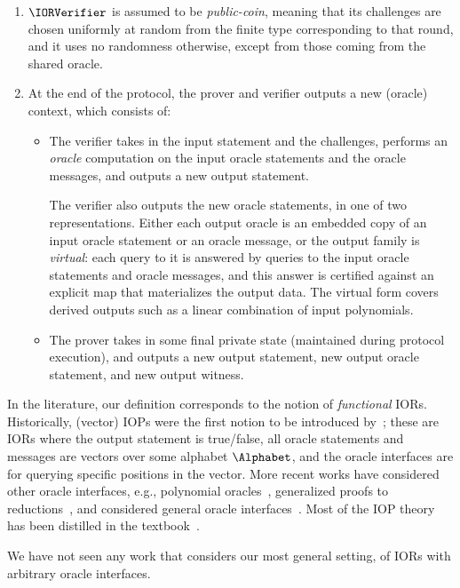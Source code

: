 \begin{enumerate}
    \item \(\IORVerifier\) is assumed to be \emph{public-coin}, meaning that its challenges are chosen
    uniformly at random from the finite type corresponding to that round, and it uses no randomness
    otherwise, except from those coming from the shared oracle.

    \item At the end of the protocol, the prover and verifier outputs a new (oracle) context, which consists of:
    \begin{itemize}
        \item The verifier takes in the input statement and the challenges, performs an \emph{oracle} computation on the input oracle statements and the oracle messages, and outputs a new output statement.

        The verifier also outputs the new oracle statements, in one of two representations. Either
        each output oracle is an embedded copy of an input oracle statement or an oracle message,
        or the output family is \emph{virtual}: each query to it is answered by queries to the
        input oracle statements and oracle messages, and this answer is certified against an
        explicit map that materializes the output data. The virtual form covers derived outputs
        such as a linear combination of input polynomials.
        \item The prover takes in some final private state (maintained during protocol execution), and outputs a new output statement, new output oracle statement, and new output witness.
    \end{itemize}
\end{enumerate}

\begin{remark}
In the literature, our definition corresponds to the notion of \emph{functional} IORs. Historically,
(vector) IOPs were the first notion to be introduced by~\cite{IOPs}; these are IORs where the output
statement is true/false, all oracle statements and messages are vectors over some alphabet \(\Alphabet\),
and the oracle interfaces are for querying specific positions in the vector. More recent works have
considered other oracle interfaces, e.g., polynomial oracles~\cite{Marlin, DARK}, generalized proofs
to reductions~\cite{ARoK, WARP, Arc, fics-facs}, and considered general oracle
interfaces~\cite{WHIR}. Most of the IOP theory has been distilled in the
textbook~\cite{ChiesaYogev2024}.

We have not seen any work that considers our most general setting, of IORs with arbitrary oracle interfaces.
\end{remark}


